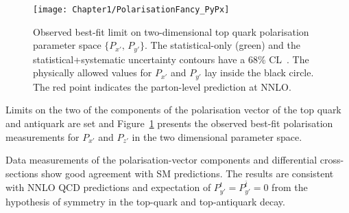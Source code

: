 \begin{figure}[h]
    \centering
    \texttt{[image: Chapter1/PolarisationFancy\_PyPx]}
    \caption{Observed best-fit limit on two-dimensional top quark polarisation
    parameter space $\{P_{x'},\, P_{y'}\}$. The statistical-only (green)
    and the statistical+systematic uncertainty contours have a 68\% CL~\cite{ATLAS:2022vym}.
    The physically allowed values for $P_{x'}$ and $P_{y'}$  lay inside the black circle. 
    The red point indicates the parton-level prediction at NNLO.}
    \label{fig:Chap1:Polarisation:Result}
\end{figure}


Limits on the two of the components of the polarisation vector of the
top quark and antiquark are set and Figure~\ref{fig:Chap1:Polarisation:Result}
presents the observed best-fit polarisation measurements for $P_{x'}$ and $P_{z'}$ in the
two dimensional parameter space.

Data measurements of the polarisation-vector components and 
differential cross-sections show good agreement with SM predictions.
 The results are consistent with NNLO QCD predictions and expectation of
$P_{y'}^{t} = P_{y'}^{\bar{t}} = 0$ from the hypothesis of \CP symmetry 
in the top-quark and top-antiquark decay. 





